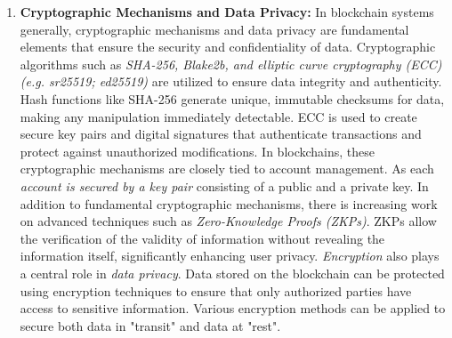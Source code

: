 \begin{enumerate}[label=\textbullet]
	\item\textbf{Cryptographic Mechanisms and Data Privacy:}\cite{sub_crypto}\cite{zkp_pub_85}
	In blockchain systems generally, cryptographic mechanisms and data privacy are fundamental elements that ensure the security and confidentiality of data. Cryptographic algorithms such as \textit{SHA-256, Blake2b, and elliptic curve cryptography (ECC) (e.g. sr25519; ed25519)} are utilized to ensure data integrity and authenticity. Hash functions like SHA-256 generate unique, immutable checksums for data, making any manipulation immediately detectable. ECC is used to create secure key pairs and digital signatures that authenticate transactions and protect against unauthorized modifications.
	In blockchains, these cryptographic mechanisms are closely tied to account management. As each \textit{account is secured by a key pair} consisting of a public and a private key. In addition to fundamental cryptographic mechanisms, there is increasing work on advanced techniques such as \textit{Zero-Knowledge Proofs (ZKPs)}. ZKPs allow the verification of the validity of information without revealing the information itself, significantly enhancing user privacy.
	\textit{Encryption} also plays a central role in \textit{data privacy}. Data stored on the blockchain can be protected using encryption techniques to ensure that only authorized parties have access to sensitive information. Various encryption methods can be applied to secure both data in "transit" and data at "rest".


\end{enumerate}
